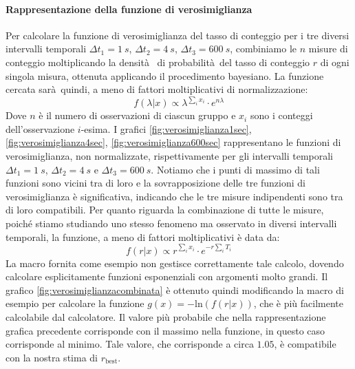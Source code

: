 \documentclass[10pt,oneside,a4paper]{article}
\begin{document}
\paragraph{Rappresentazione della funzione di verosimiglianza}
Per calcolare la funzione di verosimiglianza del tasso di conteggio per i tre diversi intervalli temporali $\Delta t_1= \SI{1}{s}$, $\Delta t_2= \SI{4}{s}$, $\Delta t_3= \SI{600}{s}$, combiniamo le $n$ misure di conteggio moltiplicando la densità  di probabilità del tasso di conteggio $r$ di ogni singola misura, ottenuta applicando il procedimento bayesiano. La funzione cercata sarà quindi, a meno di fattori moltiplicativi di normalizzazione:
\begin{equation}\label{eq:verosimiglianzatempiuguali}
f(\lambda|x) \propto \lambda^{ \sum_{i}x_i}\cdot e^{n\lambda}
\end{equation}
Dove $n$ è il numero di osservazioni di ciascun gruppo e $x_i$ sono i conteggi dell'osservazione $i$-esima.
I grafici \ref{fig:verosimiglianza1sec}, \ref{fig:verosimiglianza4sec}, \ref{fig:verosimiglianza600sec} rappresentano le funzioni di verosimiglianza, non normalizzate, rispettivamente per gli intervalli temporali $\Delta t_1= \SI{1}{s}$, $\Delta t_2= \SI{4}{s}$ e $\Delta t_3= \SI{600}{s}$. Notiamo che i punti di massimo di tali funzioni sono vicini tra di loro e la sovrapposizione delle tre funzioni di verosimiglianza è significativa, indicando che le tre misure indipendenti sono tra di loro compatibili.
Per quanto riguarda la combinazione di tutte le misure, poiché stiamo studiando uno stesso fenomeno ma osservato in diversi intervalli temporali, la funzione, a meno di fattori moltiplicativi è data da: 
\begin{equation}\label{eq:verosimiglianzatempidiversi}
f(r|x) \propto r^{\sum_{i}x_i} \cdot e^{-r\sum_{i}T_i}
\end{equation}
La macro fornita come esempio non gestisce correttamente tale calcolo, dovendo calcolare esplicitamente funzioni esponenziali con argomenti molto grandi. Il grafico \ref{fig:verosimiglianzacombinata} è ottenuto quindi modificando la macro di esempio per calcolare la funzione $g(x)=-\mathrm{ln}(f(r|x))$, che è più facilmente calcolabile dal calcolatore. Il valore più probabile che nella rappresentazione grafica precedente corrisponde con il massimo nella funzione, in questo caso corrisponde al minimo. Tale valore, che corrisponde a circa $1.05$, è compatibile con la nostra stima di $r_\mathrm{best}$.
\end{document}
